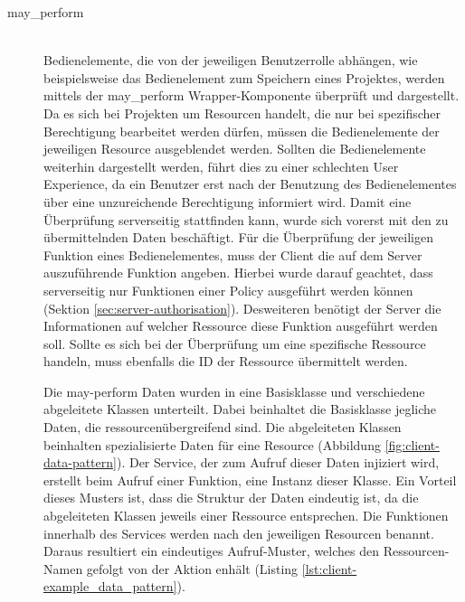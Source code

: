 \begin{description}
	\item[may\_perform]\hfill\\
	Bedienelemente, die von der jeweiligen Benutzerrolle abhängen, wie beispielsweise das Bedienelement zum Speichern eines Projektes, werden mittels der may\_perform Wrapper-Komponente überprüft und dargestellt. Da es sich bei Projekten um Resourcen handelt, die nur bei spezifischer Berechtigung bearbeitet werden dürfen, müssen die Bedienelemente der jeweiligen Resource ausgeblendet werden. Sollten die Bedienelemente weiterhin dargestellt werden, führt dies zu einer schlechten User Experience, da ein Benutzer erst nach der Benutzung des Bedienelementes über eine unzureichende Berechtigung informiert wird. Damit eine Überprüfung serverseitig stattfinden kann, wurde sich vorerst mit den zu übermittelnden Daten beschäftigt. Für die Überprüfung der jeweiligen Funktion eines Bedienelementes, muss der Client die auf dem Server auszuführende Funktion angeben. Hierbei wurde darauf geachtet, dass serverseitig nur Funktionen einer Policy ausgeführt werden können (Sektion \ref{sec:server-authorisation}). Desweiteren benötigt der Server die Informationen auf welcher Ressource diese Funktion ausgeführt werden soll. Sollte es sich bei der Überprüfung um eine spezifische Ressource handeln, muss ebenfalls die ID der Ressource übermittelt werden.
	
	\begin{minipage}{\linewidth}
		
	\end{minipage}
	
	Die may-perform Daten wurden in eine Basisklasse und verschiedene abgeleitete Klassen unterteilt. Dabei beinhaltet die Basisklasse jegliche Daten, die ressourcenübergreifend sind. Die abgeleiteten Klassen beinhalten spezialisierte Daten für eine Resource (Abbildung \ref{fig:client-data-pattern}). Der Service, der zum Aufruf dieser Daten injiziert wird, erstellt beim Aufruf einer Funktion, eine Instanz dieser Klasse. Ein Vorteil dieses Musters ist, dass die Struktur der Daten eindeutig ist, da die abgeleiteten Klassen jeweils einer Ressource entsprechen. Die Funktionen innerhalb des Services werden nach den jeweiligen Resourcen benannt. Daraus resultiert ein eindeutiges Aufruf-Muster, welches den Ressourcen-Namen gefolgt von der Aktion enhält (Listing \ref{lst:client-example_data_pattern}). 
	

\end{description}
